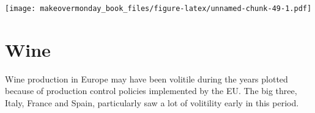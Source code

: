 \documentclass[]{book}
\newenvironment{Shaded}{\begin{snugshade}}{\end{snugshade}}
\newcommand{\KeywordTok}[1]{\textcolor[rgb]{0.13,0.29,0.53}{\textbf{#1}}}
\newcommand{\StringTok}[1]{\textcolor[rgb]{0.31,0.60,0.02}{#1}}
\newcommand{\OperatorTok}[1]{\textcolor[rgb]{0.81,0.36,0.00}{\textbf{#1}}}
\newcommand{\NormalTok}[1]{#1}
\theoremstyle{definition}
\theoremstyle{definition}
\theoremstyle{definition}
\theoremstyle{remark}
\begin{document}
\texttt{[image: makeovermonday\_book\_files/figure-latex/unnamed-chunk-49-1.pdf]}

\chapter{Wine}\label{wine}

Wine production in Europe may have been volitile during the years
plotted because of production control policies implemented by the EU.
The big three, Italy, France and Spain, particularly saw a lot of
volitility early in this period.

\begin{Shaded}
\end{Shaded}
\end{document}
